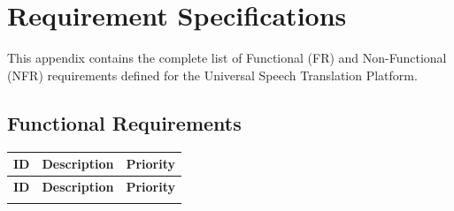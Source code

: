 \appendix
\chapter{Requirement Specifications}
\label{app:requirements}

This appendix contains the complete list of Functional (FR) and Non-Functional (NFR) requirements defined for the Universal Speech Translation Platform.

\section{Functional Requirements}

\begin{longtable}{|l|p{10cm}|l|}
\hline
\textbf{ID} & \textbf{Description} & \textbf{Priority} \\ \hline
\endfirsthead
\hline
\textbf{ID} & \textbf{Description} & \textbf{Priority} \\ \hline
\endhead
\hline
\endfoot


\end{longtable}
